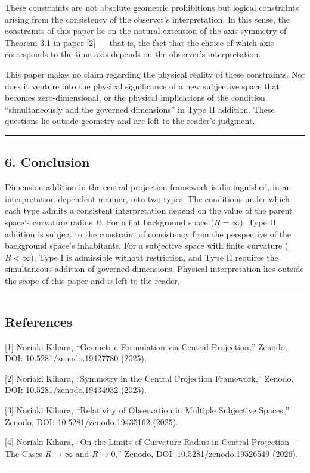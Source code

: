 \documentclass[a4paper,11pt]{article}
\theoremstyle{definition}
\begin{document}
These constraints are not absolute geometric prohibitions but logical constraints arising from the consistency of the observer's interpretation. In this sense, the constraints of this paper lie on the natural extension of the axis symmetry of Theorem 3.1 in paper {[}2{]} --- that is, the fact that the choice of which axis corresponds to the time axis depends on the observer's interpretation.

This paper makes no claim regarding the physical reality of these constraints. Nor does it venture into the physical significance of a new subjective space that becomes zero-dimensional, or the physical implications of the condition ``simultaneously add the governed dimensions'' in Type II addition. These questions lie outside geometry and are left to the reader's judgment.

\begin{center}\rule{0.5\linewidth}{0.5pt}\end{center}

\subsection{6. Conclusion}\label{conclusion}

Dimension addition in the central projection framework is distinguished, in an interpretation-dependent manner, into two types. The conditions under which each type admits a consistent interpretation depend on the value of the parent space's curvature radius \(R\). For a flat background space (\(R = \infty\)), Type II addition is subject to the constraint of consistency from the perspective of the background space's inhabitants. For a subjective space with finite curvature (\(R < \infty\)), Type I is admissible without restriction, and Type II requires the simultaneous addition of governed dimensions. Physical interpretation lies outside the scope of this paper and is left to the reader.

\begin{center}\rule{0.5\linewidth}{0.5pt}\end{center}

\subsection{References}\label{references}

{[}1{]} Noriaki Kihara, ``Geometric Formulation via Central Projection,'' Zenodo, DOI: 10.5281/zenodo.19427780 (2025).

{[}2{]} Noriaki Kihara, ``Symmetry in the Central Projection Framework,'' Zenodo, DOI: 10.5281/zenodo.19434932 (2025).

{[}3{]} Noriaki Kihara, ``Relativity of Observation in Multiple Subjective Spaces,'' Zenodo, DOI: 10.5281/zenodo.19435162 (2025).

{[}4{]} Noriaki Kihara, ``On the Limits of Curvature Radius in Central Projection --- The Cases \(R \to \infty\) and \(R \to 0\),'' Zenodo, DOI: 10.5281/zenodo.19526549 (2026).

\begin{center}\rule{0.5\linewidth}{0.5pt}\end{center}
\end{document}
